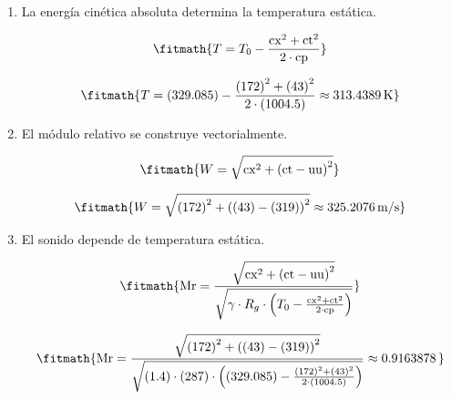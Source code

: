 \begin{enumerate}

\item La energía cinética absoluta determina la temperatura estática.

\[\fitmath{T=T_0-\frac{{\mathrm{cx}}^{2}+{\mathrm{ct}}^{2}}{2\cdot \mathrm{cp}}}\]

\[\fitmath{T=(329.085)-\frac{{(172)}^{2}+{(43)}^{2}}{2\cdot (1004.5)}\approx 313.4389\,\mathrm{K}}\]

\item El módulo relativo se construye vectorialmente.

\[\fitmath{W=\sqrt{{\mathrm{cx}}^{2}+{\left(\mathrm{ct}-\mathrm{uu}\right)}^{2}}}\]

\[\fitmath{W=\sqrt{{(172)}^{2}+{\left((43)-(319)\right)}^{2}}\approx 325.2076\,\mathrm{m/s}}\]

\item El sonido depende de temperatura estática.

\[\fitmath{\mathrm{Mr}=\frac{\sqrt{{\mathrm{cx}}^{2}+{\left(\mathrm{ct}-\mathrm{uu}\right)}^{2}}}{\sqrt{\gamma\cdot R_g\cdot \left(T_0-\frac{{\mathrm{cx}}^{2}+{\mathrm{ct}}^{2}}{2\cdot \mathrm{cp}}\right)}}}\]

\[\fitmath{\mathrm{Mr}=\frac{\sqrt{{(172)}^{2}+{\left((43)-(319)\right)}^{2}}}{\sqrt{(1.4)\cdot (287)\cdot \left((329.085)-\frac{{(172)}^{2}+{(43)}^{2}}{2\cdot (1004.5)}\right)}}\approx 0.9163878\,}\]

\end{enumerate}
